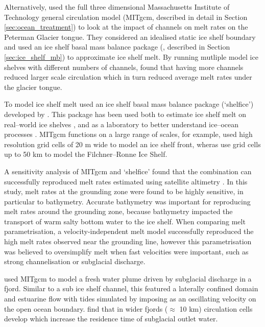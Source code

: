 Alternatively, \cite{millgate2013effect} used the full three dimensional Massachusetts Institute of Technology general circulation model (MITgcm, described in detail in Section \ref{sec:ocean_treatment}) to look at the impact of channels on melt rates on the Peterman Glacier tongue. They considered an idealised static ice shelf boundary and used an ice shelf basal mass balance package (\cite{losch2008modeling}, described in Section \ref{sec:ice_shelf_mb}) to approximate ice shelf melt. By running mutliple model ice shelves with different numbers of channels, \citeauthor{millgate2013effect} found that having more channels reduced larger scale circulation which in turn reduced average melt rates under the glacier tongue.

To model ice shelf melt \cite{millgate2013effect} used an ice shelf basal mass balance package (`shelfice') developed by \cite{losch2008modeling}. This package has been used both to estimate ice shelf melt on real--world ice shelves \citep[e.g.][]{goldberg2019accurately}, and as a laboratory to better understand ice--ocean processes \citep[e.g.][]{xu2012numerical}. MITgcm functions on a large range of scales, for example, \cite{xu2012numerical} used high resolution grid cells of 20 m wide to model an ice shelf front, wheras \cite{naughten2021two} use grid cells up to 50 km to model the Filchner–Ronne Ice Shelf. 

A sensitivity analysis of MITgcm and `shelfice' found that the combination can successfully reproduced melt rates estimated using satellite altimetry \citep{goldberg2019accurately}. In this study, melt rates at the grounding zone were found to be highly sensitive, in particular to bathymetry. Accurate bathymetry was important for reproducing melt rates around the grounding zone, because bathymetry impacted the transport of warm salty bottom water to the ice shelf. When comparing melt parametrisation, a velocity-independent melt model successfully reproduced the high melt rates observed near the grounding line, however this parametrisation was believed to oversimplify melt when fast velocities were important, such as strong channelisation or subglacial discharge.


\cite{carroll2017subglacial} used MITgcm to model a fresh water plume driven by subglacial discharge in a fjord.  Similar to a sub ice shelf channel, this featured a laterally confined domain and estuarine flow with tides simulated by imposing as an oscillating velocity on the open ocean boundary. \cite{carroll2017subglacial} find that in wider fjords ($\approx$ 10 km) circulation cells develop which increase the residence time of subglacial outlet water. 

